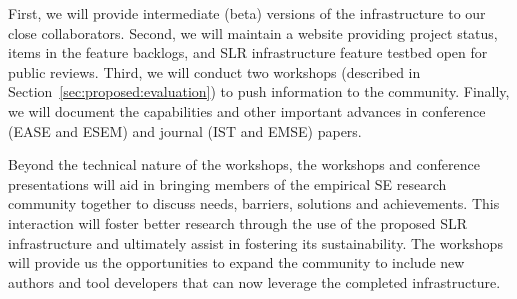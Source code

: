 
First, we will provide intermediate (beta) versions of the infrastructure to our close collaborators.
Second, we will maintain a website providing project status, items in the feature backlogs, and SLR infrastructure feature testbed open for public reviews.
Third, we will conduct two workshops (described in Section~\ref{sec:proposed:evaluation}) to push information to the community.
Finally, we will document the capabilities and other important advances in conference (EASE and ESEM) and journal (IST and EMSE) papers.

Beyond the technical nature of the workshops, the workshops and conference presentations will aid in bringing members of the empirical SE research community together to discuss needs, barriers, solutions and achievements. 
This interaction will foster better research through the use of the proposed SLR infrastructure and ultimately assist in fostering its sustainability.
The workshops will provide us the opportunities to expand the community to include new authors and tool developers that can now leverage the completed infrastructure.
